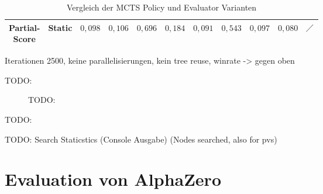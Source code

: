 \begin{table}[H]
{\begin{tabular}{|c|c|c|c|c|c|c|c|c|c|c|}
            \tiny \makecell{Partial-                                                                                                                                                                                                                                                                                                                                                              \\Score} &        Static & \cellcolor[HTML]{f9826f}$0{,}098$ & \cellcolor[HTML]{f98470}$0{,}106$ & \cellcolor[HTML]{c2da81}$0{,}696$ & \cellcolor[HTML]{fa9874}$0{,}184$ & \cellcolor[HTML]{f9806f}$0{,}091$ & \cellcolor[HTML]{f2e884}$0{,}543$ & \cellcolor[HTML]{f9826f}$0{,}097$ & \cellcolor[HTML]{f97d6e}$0{,}080$ & $\diagup$                         \\ \hline
        \end{tabular}}
    \vspace{3pt}
    \caption{Vergleich der \acs{MCTS} Policy und Evaluator Varianten}
    \label{tabelle:mcts-policy-eval-comparision}
\end{table}

Iterationen 2500, keine parallelisierungen, kein tree reuse, winrate -> gegen oben

TODO:

\begin{figure}[!ht]
    \centering
    \caption{TODO:}
    \label{fig:mcts-tree-reuse-comparision}
\end{figure}


TODO:

TODO: Search Staticstics (Console Ausgabe) (Nodes searched, also for pvs)

\section{Evaluation von AlphaZero}

